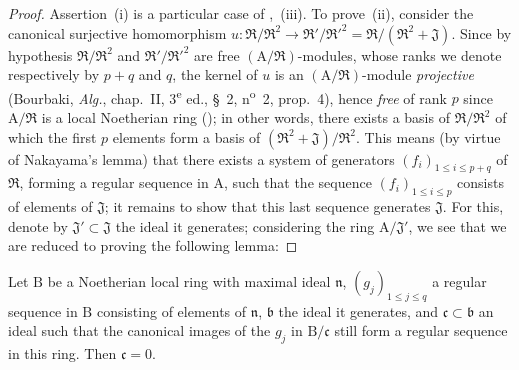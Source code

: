\begin{proof}
Assertion~(i) is a particular case of ,~(iii).
To prove~(ii), consider the canonical surjective homomorphism $u:\mathfrak{R}/\mathfrak{R}^2\to\mathfrak{R}'/\mathfrak{R}'^2=\mathfrak{R}/(\mathfrak{R}^2+\mathfrak{J})$.
Since by hypothesis $\mathfrak{R}/\mathfrak{R}^2$ and $\mathfrak{R}'/\mathfrak{R}'^2$ are free $(\mathrm{A}/\mathfrak{R})$-modules, whose ranks we denote respectively by $p+q$ and $q$, the kernel of $u$ is an $(\mathrm{A}/\mathfrak{R})$-module \emph{projective} (Bourbaki, \emph{Alg.}, chap.~II, 3\textsuperscript{e} ed., \S~2, n\textsuperscript{o}~2, prop.~4), hence \emph{free} of rank $p$ since $\mathrm{A}/\mathfrak{R}$ is a local Noetherian ring (); in other words, there exists a basis of $\mathfrak{R}/\mathfrak{R}^2$ of which the first $p$ elements form a basis of $(\mathfrak{R}^2+\mathfrak{J})/\mathfrak{R}^2$.
This means (by virtue of Nakayama's lemma) that there exists a system of generators $(f_i)_{1\leq i\leq p+q}$ of $\mathfrak{R}$, forming a regular sequence in $\mathrm{A}$, such that the sequence $(f_i)_{1\leq i\leq p}$ consists of elements of $\mathfrak{J}$; it remains to show that this last sequence generates $\mathfrak{J}$.
For this, denote by $\mathfrak{J}'\subset\mathfrak{J}$ the ideal it generates; considering the ring $\mathrm{A}/\mathfrak{J}'$, we see that we are reduced to proving the following lemma:
\end{proof}

\begin{lemma}[19.1.6.1]
\label{IV.19.1.6.1}
Let $\mathrm{B}$ be a Noetherian local ring with maximal ideal $\mathfrak{n}$, $(g_j)_{1\leq j\leq q}$ a regular sequence in $\mathrm{B}$ consisting of elements of $\mathfrak{n}$, $\mathfrak{b}$ the ideal it generates, and $\mathfrak{c}\subset\mathfrak{b}$ an ideal such that the canonical images of the $g_j$ in $\mathrm{B}/\mathfrak{c}$ still form a regular sequence in this ring.
Then $\mathfrak{c}=0$.
\end{lemma}

